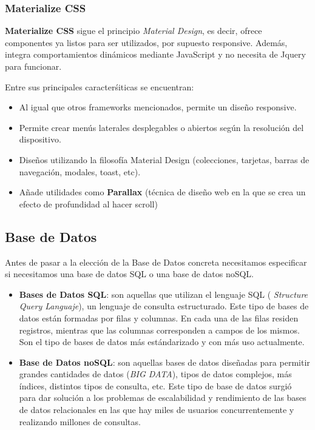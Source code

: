     \subsubsection{Materialize CSS}
    \textbf{Materialize CSS} sigue el principio \textit{Material Design}, es decir, ofrece
    componentes ya listos para ser utilizados, por supuesto responsive. Además, integra
    comportamientos dinámicos mediante JavaScript y no necesita de Jquery para funcionar.

    Entre sus principales caracterśiticas se encuentran:
        
        \begin{itemize}
            \item Al igual que otros frameworks mencionados, permite un diseño responsive.
            \item Permite crear menús laterales desplegables o abiertos según la resolución
            del dispositivo.
            \item Diseños utilizando la filosofía Material Design (colecciones, tarjetas,
            barras de navegación, modales, toast, etc).
            \item Añade utilidades como \textbf{Parallax} (técnica de diseño web en la que se crea
            un efecto de profundidad al hacer scroll)
        \end{itemize}

\subsection{Base de Datos}
Antes de pasar a la elección de la Base de Datos concreta necesitamos especificar si
necesitamos una base de datos SQL o una base de datos noSQL. 
\begin{itemize}
    \item \textbf{Bases de Datos SQL}: son aquellas que utilizan el lenguaje SQL (
    \textit{Structure Query Languaje}), un lenguaje de consulta estructurado. Este tipo de 
    bases de datos están formadas por filas y columnas. En cada una de las filas residen
    registros, mientras que las columnas corresponden a campos de los mismos. Son el tipo
    de bases de datos más estándarizado y con más uso actualmente.
    \item \textbf{Base de Datos noSQL}:  son aquellas bases de datos diseñadas para permitir
    grandes cantidades de datos (\textit{BIG DATA}), tipos de datos complejos, más índices,
    distintos tipos de consulta, etc. Este tipo de base de datos surgió para dar solución
    a los problemas de escalabilidad y rendimiento de las bases de datos relacionales en las
    que hay miles de usuarios concurrentemente y realizando millones de consultas.
\end{itemize}

